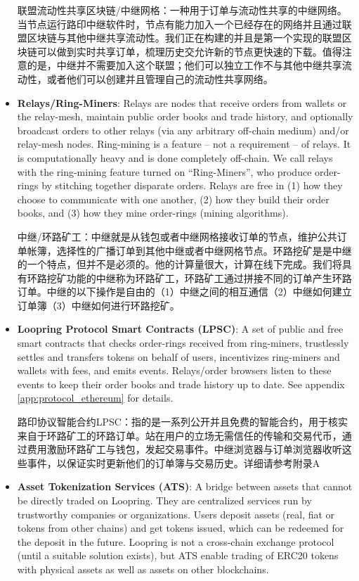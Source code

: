 \documentclass[UTF8,nofonts]{ctexart}
\begin{document}
\begin{multicols}{2}
\begin{itemize}
联盟流动性共享区块链/中继网格：一种用于订单与流动性共享的中继网络。当节点运行路印中继软件时，节点有能力加入一个已经存在的网络并且通过联盟区块链与其他中继共享流动性。我们正在构建的并且是第一个实现的联盟区块链可以做到实时共享订单，梳理历史交允许新的节点更快速的下载。值得注意的是，中继并不需要加入这个联盟；他们可以独立工作不与其他中继共享流动性，或者他们可以创建并且管理自己的流动性共享网络。


\item \textbf{Relays/Ring-Miners}: Relays are nodes that receive orders from wallets or the relay-mesh, maintain public order books and trade history, and optionally broadcast orders to other relays (via any arbitrary off-chain medium) and/or relay-mesh nodes. Ring-mining is a feature -- not a requirement -- of relays. It is computationally heavy and is done completely off-chain. We call relays with the ring-mining feature turned on \enquote{Ring-Miners}, who produce order-rings by stitching together disparate orders. Relays are free in (1) how they choose to communicate with one another, (2) how they build their order books, and (3) how they mine order-rings (mining algorithms).

中继/环路矿工：中继就是从钱包或者中继网格接收订单的节点，维护公共订单帐簿，选择性的广播订单到其他中继或者中继网格节点。环路挖矿是是中继的一个特点，但并不是必须的。他的计算量很大，计算在线下完成。我们将具有环路挖矿功能的中继称为环路矿工，环路矿工通过拼接不同的订单产生环路订单。中继的以下操作是自由的（1）中继之间的相互通信（2）中继如何建立订单簿（3）中继如何进行环路挖矿。


\item \textbf{Loopring Protocol Smart Contracts (LPSC)}: A set of public and free smart contracts that checks order-rings received from ring-miners, trustlessly settles and transfers tokens on behalf of users, incentivizes ring-miners and wallets with fees, and emits events. Relays/order browsers listen to these events to keep their order books and trade history up to date. See appendix \ref{app:protocol_ethereum} for details.

路印协议智能合约LPSC：指的是一系列公开并且免费的智能合约，用于核实来自于环路矿工的环路订单。站在用户的立场无需信任的传输和交易代币，通过费用激励环路矿工与钱包，发起交易事件。中继浏览器与订单浏览器收听这些事件，以保证实时更新他们的订单簿与交易历史。详细请参考附录A


\item \textbf{Asset Tokenization Services (ATS)}: A bridge between assets that cannot be directly traded on Loopring. They are centralized services run by trustworthy companies or organizations. Users deposit assets (real, fiat or tokens from other chains) and get tokens issued, which can be redeemed for the deposit in the future. Loopring is not a cross-chain exchange protocol (until a suitable solution exists), but ATS enable trading of ERC20 tokens \cite{ERC20} with physical assets as well as assets on other blockchains. 


\end{itemize}
\end{multicols}
\end{document}
